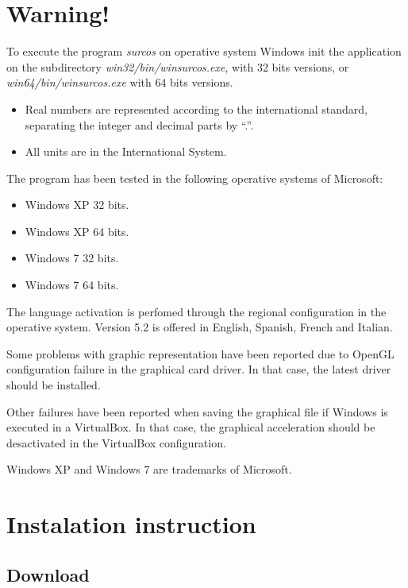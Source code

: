 \chapter*{Warning!}

To execute the program \emph{surcos} on operative system Windows init the
application on the subdirectory \emph{win32/bin/winsurcos.exe}, with 32 bits
versions, or \emph{win64/bin/winsurcos.exe} with 64 bits versions.

\begin{itemize}
\item Real numbers are represented according to the international standard,
separating the integer and decimal parts by ``.''.
\item All units are in the International System.
\end{itemize}

The program has been tested in the following operative systems of Microsoft:
\begin{itemize}
\item Windows XP 32 bits.
\item Windows XP 64 bits.
\item Windows 7 32 bits.
\item Windows 7 64 bits.
\end{itemize}

The language activation is perfomed through the regional configuration in the 
operative system. Version 5.2 is offered in English, Spanish, French and Italian. 

Some problems with graphic representation have been reported due to OpenGL 
configuration failure in the graphical card driver. In that case, the latest driver
should be installed.

Other failures have been reported when saving the graphical file if Windows is
executed in a VirtualBox. In that case, the graphical acceleration should be desactivated
in the VirtualBox configuration.

Windows XP and Windows 7 are trademarks of Microsoft.

\setcounter{page}{1}

\chapter{Instalation instruction}

\section{Download}

